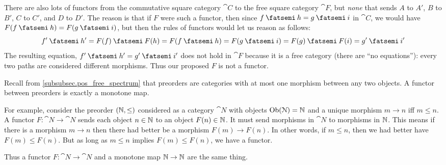 \documentclass[7Sketches]{subfiles}
\begin{document}
\begin{example}
There are also lots of functors from the commutative square category $\cat{C}$ to the free square category $\cat{F}$, but \emph{none} that sends $A$ to $A'$, $B$ to $B'$, $C$ to $C'$, and $D$ to $D'$. The reason is that if $F$ were such a functor, then since $f\cp h=g\cp i$ in $\cat{C}$, we would have $F(f\cp h)=F(g\cp i)$, but then the rules of functors would let us reason as follows:
\[f'\cp h'=F(f)\cp F(h)=F(f\cp h)=F(g\cp i)=F(g)\cp F(i)=g'\cp i'\]
The resulting equation, $f'\cp h'=g'\cp i'$ does not hold in $\cat{F}$ because it is a free category (there are ``no equations''): every two paths are considered different morphisms. Thus our proposed $F$ is not a functor.
\end{example}

\begin{example}
%
\label{ex.preorder_functor}%
Recall from \cref{subsubsec.pos_free_spectrum} that preorders are categories with
at most one morphism between any two objects. A functor between preorders is
exactly a monotone map.

For example, consider the preorder $(\mathbb{N},\leq)$ considered as a category $\cat{N}$ with objects $\operatorname{Ob}(\mathcal{N})=\mathbb{N}$ and a unique morphism $m\to n$ iff $m\leq n$. A functor $F\colon\cat{N}\to\cat{N}$ sends each object $n\in\mathbb{N}$ to an object $F(n)\in\mathbb{N}$. It must send morphisms in $\cat{N}$ to morphisms in $\mathbb{N}$. This means if there is a morphism $m\to n$ then there had better be a morphism $F(m)\to F(n)$. In other words, if $m\leq n$, then we had better have $F(m)\leq F(n)$. But as long as $m\leq n$ implies $F(m)\leq F(n)$, we have a functor.

Thus a functor $F\colon\cat{N}\to\cat{N}$ and a monotone map $\mathbb{N}\to\mathbb{N}$ are the same thing.
\end{example}
\end{document}
